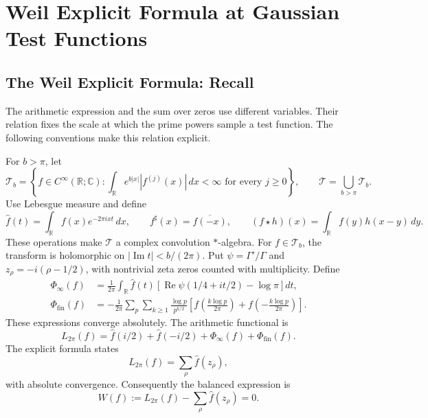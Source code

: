 \section{Weil Explicit Formula at Gaussian Test Functions}
\label{v4-arith:w5-i:weil-gaussians}

\subsection{The Weil Explicit Formula: Recall}
\label{v4-arith:w5-i:weil-recall}

The arithmetic expression and the sum over zeros use different variables.
Their relation fixes the scale at which the prime powers sample a test
function. The following conventions make this relation explicit.

\begin{lemma}
\label{v4-arith:w5-i:lem:weil}

For $b>\pi$, let
\[
 \mathcal T_b=\left\{f\in C^\infty(\mathbb R;\mathbb C):
 \int_{\mathbb R}e^{b|x|}|f^{(j)}(x)|\,dx<\infty
 \text{ for every }j\geq0\right\},\qquad
 \mathcal T=\bigcup_{b>\pi}\mathcal T_b.
\]
Use Lebesgue measure and define
\[
 \widehat f(t)=\int_{\mathbb R}f(x)e^{-2\pi ixt}\,dx,\qquad
 f^\sharp(x)=\overline{f(-x)},\qquad
 (f\star h)(x)=\int_{\mathbb R}f(y)h(x-y)\,dy.
\]
These operations make $\mathcal T$ a complex convolution
$*$-algebra. For $f\in\mathcal T_b$, the transform is holomorphic
on $|\operatorname{Im}t|<b/(2\pi)$.
Put $\psi=\Gamma'/\Gamma$ and $z_\rho=-i(\rho-1/2)$,
with nontrivial zeta zeros counted with multiplicity. Define
\begin{align}
 \Phi_\infty(f)
 &=\frac1{2\pi}\int_{\mathbb R}\widehat f(t)
 \left[\operatorname{Re}\psi(1/4+it/2)-\log\pi\right]dt,
 \label{v4-arith:w5-i:eq:phi-arch}\\
 \Phi_{\mathrm{fin}}(f)
 &=-\frac1{2\pi}\sum_p\sum_{k\geq1}
 \frac{\log p}{p^{k/2}}
 \left[f\left(\frac{k\log p}{2\pi}\right)
       +f\left(-\frac{k\log p}{2\pi}\right)\right].
 \label{v4-arith:w5-i:eq:phi-fin}
\end{align}
These expressions converge absolutely. The arithmetic functional is
\[
 L_{2\pi}(f)=\widehat f(i/2)+\widehat f(-i/2)
                  +\Phi_\infty(f)+\Phi_{\mathrm{fin}}(f).
\]
The explicit formula states
\[
 L_{2\pi}(f)=\sum_\rho\widehat f(z_\rho),
\]
with absolute convergence. Consequently the balanced expression is
\begin{equation}
 W(f):=L_{2\pi}(f)-\sum_\rho\widehat f(z_\rho)=0.
 \label{v4-arith:w5-i:eq:weil-def}
\end{equation}
\end{lemma}
